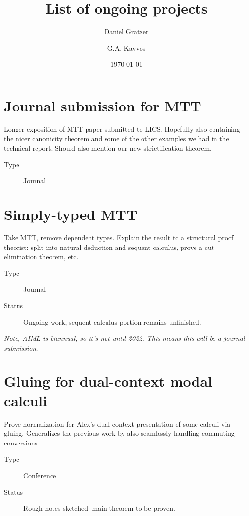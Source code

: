 \documentclass{amsart}
\title{List of ongoing projects}
\author{Daniel Gratzer \and G.A. Kavvos}
\date{\today}
\begin{document}
\maketitle


\section*{Journal submission for MTT}

Longer exposition of MTT paper submitted to LICS. Hopefully also containing the nicer canonicity
theorem and some of the other examples we had in the technical report. Should also mention our new
strictification theorem.

\begin{description}
\item[Type] Journal
\end{description}

\section*{Simply-typed MTT}

Take MTT, remove dependent types. Explain the result to a structural proof theorist: split into
natural deduction and sequent calculus, prove a cut elimination theorem, etc.

\begin{description}
\item[Type] Journal
\item[Status] Ongoing work, sequent calculus portion remains unfinished.
\end{description}

\emph{Note, AIML is biannual, so it's not until 2022. This means this will be a journal submission.}

\section*{Gluing for dual-context modal calculi}

Prove normalization for Alex's dual-context presentation of some calculi via gluing. Generalizes the
previous work by also seamlessly handling commuting conversions.

\begin{description}
\item[Type] Conference
\item[Status] Rough notes sketched, main theorem to be proven.
\end{description}
\end{document}
